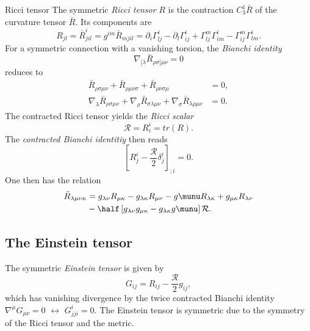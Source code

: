 \begin{mybox}{Ricci tensor}
	The symmetric \emph{Ricci tensor} $R$ is the contraction $C^1_3 \bar{R}$ of the curvature tensor $\bar{R}$. Its components are 
	\begin{equation}
		R_{jl} = \bar{R}^i_{jil} = g^{i m} \bar{R}_{mjil}=\partial_i \Gamma^i_{lj} - \partial_l \Gamma^i_{ij} + \Gamma^m_{lj} \Gamma^i_{im} - \Gamma^m_{ij} \Gamma^i_{lm}.
	\end{equation}
	For a symmetric connection with a vanishing torsion, the \emph{Bianchi identity} 
	\begin{equation}
	\nabla_{[\lambda} \bar{R}_{\rho \sigma] \mu \nu} =0
	\end{equation}
	reduces to 
	\begin{align}
	\bar{R}_{\rho \sigma \mu \nu} + \bar{R}_{\rho \mu \nu \sigma}+\bar{R}_{\rho \nu \sigma \mu} & = 0,\\
	 				\nabla_\lambda \bar{R}_{\rho \sigma \mu \nu}+\nabla_\rho \bar{R}_{\sigma \lambda \mu \nu}+\nabla_\sigma\bar{R}_{\lambda \rho \mu \nu} &=0.
	\end{align}
	The contracted Ricci tensor yields the \emph{Ricci scalar}
	\begin{equation}
	 \mathcal{R} = R^i_i = tr(R).
	\end{equation}
	The \emph{contracted Bianchi identitiy} then reads
	\begin{equation}
		\left[R^i_j -\frac{\mathcal{R}}{2} \delta^i_j\right]_{;i} = 0.
	\end{equation}
	One then has the relation
	\begin{align}
		\bar{R}_{\lambda \mu \nu \kappa} &= g_{\lambda \nu} R_{\mu \kappa} - g_{\lambda \kappa} R_{\mu \nu} - g\munu R_{\lambda \kappa} + g_{\mu \kappa} R_{\lambda \nu} \nonumber \\
		&- \half \left[g_{\lambda\nu} g_{\mu \kappa} - g_{\lambda\kappa} g\munu\right] \mathcal{R}.
	\end{align}
\end{mybox}
\subsection{The Einstein tensor}
The symmetric \emph{Einstein tensor} is given by
\begin{equation}
G_{ij} = R_{ij}  -\frac{\mathcal{R}}{2} g_{ij},
\end{equation}
which has vanishing divergence by the twice contracted Bianchi identity $\nabla^{\mu} G_{\mu \nu} = 0$ $\leftrightarrow$ $G^i_{jji} =0$.
The Einstein tensor is symmetric due to the symmetry of the Ricci tensor and the
metric.


















